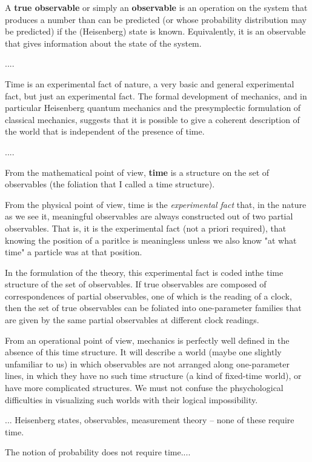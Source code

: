 A \textbf{true observable} or simply an \textbf{observable} is an operation on
the system that produces a number than can be predicted (or whose
probability distribution may be predicted) if the (Heisenberg)
state is known.  Equivalently, it is an observable that gives
information about the state of the system.  

....

Time is an experimental fact of nature, a very basic and general
experimental fact, but just an experimental fact.  The formal
development of mechanics, and in particular Heisenberg quantum
mechanics and the presymplectic formulation of classical
mechanics, suggests that it is possible to give a coherent
description of the world that is independent of the presence of
time.

....

From the mathematical point of view, \textbf{time} is a structure on the
set of observables (the foliation that I called a time
structure).  

From the physical point of view, time is the \emph{experimental fact}
that, in the nature as we see it, meaningful observables are
always constructed out of two partial observables.  That is, it
is the experimental fact (not a priori required), that knowing
the position of a paritlce is meaningless unless we also know "at
what time" a particle was at that position.

In the formulation of the theory, this experimental fact is coded
inthe time structure of the set of observables.  If true
observables are composed of correspondences of partial
observables, one of which is the reading of a clock, then the set
of true observables can be foliated into one-parameter families
that are given by the same partial observables at different clock
readings.  

From an operational point of view, mechanics is perfectly well
defined in the absence of this time structure.  It will describe
a world (maybe one slightly unfamiliar to us) in which
observables are not arranged along one-parameter lines, in which
they have no such time structure (a kind of fixed-time world), or
have more complicated structures.  We must not confuse the
phsychological difficulties in visualizing such worlds with their
logical impossibility.

... Heisenberg states, observables, measurement theory -- none of
these require time.

The notion of probability does not require time....

